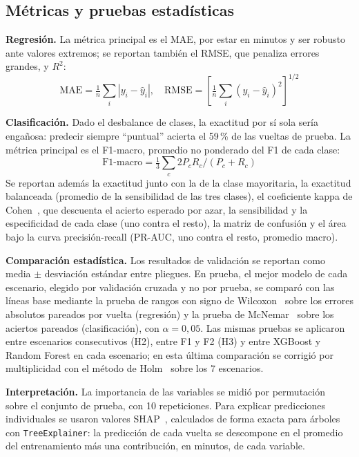\documentclass[conference]{IEEEtran}
\begin{document}
\subsection{Métricas y pruebas estadísticas}\label{sec:metricas}
\textbf{Regresión.} La métrica principal es el MAE, por estar en minutos y ser robusto ante valores extremos; se reportan también el RMSE, que penaliza errores grandes, y $R^2$:
\begin{equation}
\text{MAE} = \tfrac{1}{n}\textstyle\sum_i |y_i - \hat{y}_i|, \quad \text{RMSE} = \left[\tfrac{1}{n}\textstyle\sum_i (y_i - \hat{y}_i)^2\right]^{1/2}
\end{equation}

\textbf{Clasificación.} Dado el desbalance de clases, la exactitud por sí sola sería engañosa: predecir siempre ``puntual'' acierta el 59\,\% de las vueltas de prueba. La métrica principal es el F1-macro, promedio no ponderado del F1 de cada clase:
\begin{equation}
\text{F1-macro} = \tfrac{1}{3}\textstyle\sum_c 2 P_c R_c / (P_c + R_c)
\end{equation}
Se reportan además la exactitud junto con la de la clase mayoritaria, la exactitud balanceada (promedio de la sensibilidad de las tres clases), el coeficiente kappa de Cohen~\cite{cohen1960}, que descuenta el acierto esperado por azar, la sensibilidad y la especificidad de cada clase (uno contra el resto), la matriz de confusión y el área bajo la curva precisión-recall (PR-AUC, uno contra el resto, promedio macro).

\textbf{Comparación estadística.} Los resultados de validación se reportan como media $\pm$ desviación estándar entre pliegues. En prueba, el mejor modelo de cada escenario, elegido por validación cruzada y no por prueba, se comparó con las líneas base mediante la prueba de rangos con signo de Wilcoxon~\cite{wilcoxon1945} sobre los errores absolutos pareados por vuelta (regresión) y la prueba de McNemar~\cite{mcnemar1947} sobre los aciertos pareados (clasificación), con $\alpha = 0{,}05$. Las mismas pruebas se aplicaron entre escenarios consecutivos (H2), entre F1 y F2 (H3) y entre XGBoost y Random Forest en cada escenario; en esta última comparación se corrigió por multiplicidad con el método de Holm~\cite{holm1979} sobre los 7 escenarios.

\textbf{Interpretación.} La importancia de las variables se midió por permutación~\cite{breiman2001} sobre el conjunto de prueba, con 10 repeticiones. Para explicar predicciones individuales se usaron valores SHAP~\cite{lundberg2017}, calculados de forma exacta para árboles con \texttt{TreeExplainer}: la predicción de cada vuelta se descompone en el promedio del entrenamiento más una contribución, en minutos, de cada variable.
\end{document}
